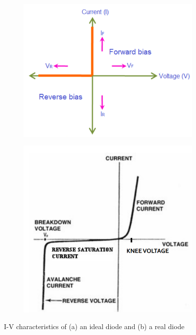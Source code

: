 \begin{figure}[H]
     \centering
     \begin{subfigure}[b]{0.35\textwidth}
         \centering
         \includegraphics[width=\textwidth]{images/d2.png}
     \end{subfigure}
     \hfill
     \begin{subfigure}[b]{0.35\textwidth}
         \centering
         \includegraphics[width=\textwidth]{images/d3.png}
     \end{subfigure}
     \hfill
        \caption{I-V characteristics of (a) an ideal diode and (b) a real diode}
\end{figure}


